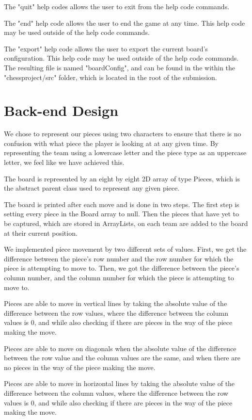 \documentclass[conference]{IEEEtran}
\begin{document}
The "quit" help codes allows the user to exit from the help code commands.

The "end" help code allows the user to end the game at any time. This help code may be used outside of the help code commands.

The "export" help code allows the user to export the current board's configuration. This help code may be used outside of the help code commands. The resulting file is named "boardConfig", and can be found in the within the "chessproject/src" folder, which is located in the root of the submission.

	
\section{Back-end Design}
We chose to represent our pieces using two characters to ensure that there is no confusion with what piece the player is looking at at any given time. By representing the team using a lowercase letter and the piece type as an uppercase letter, we feel like we have achieved this.

The board is represented by an eight by eight 2D array of type Pieces, which is the abstract parent class used to represent any given piece.

The board is printed after each move and is done in two steps. The first step is setting every piece in the Board array to null. Then the pieces that have yet to be captured, which are stored in ArrayLists, on each team are added to the board at their current position.

We implemented piece movement by two different sets of values. First, we get the difference between the piece's row number and the row number for which the piece is attempting to move to. Then, we got the difference between the piece's column number, and the column number for which the piece is attempting to move to.

Pieces are able to move in vertical lines by taking the absolute value of the difference between the row values, where the difference between the column values is 0, and while also checking if there are pieces in the way of the piece making the move.

Pieces are able to move on diagonals when the absolute value of the difference between the row value and the column values are the same, and when there are no pieces in the way of the piece making the move.

Pieces are able to move in horizontal lines by taking the absolute value of the difference between the column values, where the difference between the row values is 0, and while also checking if there are pieces in the way of the piece making the move.
\end{document}
